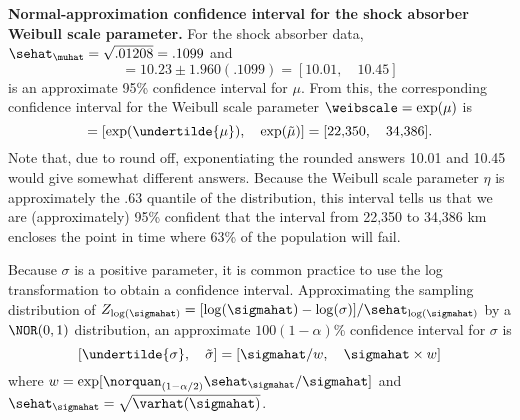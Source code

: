 \begin{example}
\label{example:normal.theory.ci.for.shock.mu}
{\bf Normal-approximation confidence interval for the shock absorber
Weibull scale parameter.} For the shock absorber data,
$\sehat_{\muhat}=\sqrt{.01208}=.1099$ and
\begin{displaymath}
 [\undertilde{\mu},\quad \tilde{\mu}] =
10.23 \pm  1.960 (.1099) = [10.01, \quad 10.45]
\end{displaymath}
is an approximate 95\% confidence interval for $\mu$.
From this, the corresponding confidence interval for
the Weibull scale parameter $\weibscale=\exp(\mu)$ is
\begin{displaymath}
 [\undertilde{\weibscale},\quad \tilde{\weibscale}] = 
	[\exp(\undertilde{\mu}),\quad \exp(\tilde{\mu})]
=[\text{22,350}, \quad \text{34,386}].
\end{displaymath}
Note that, due to round off, exponentiating the rounded answers
10.01 and 10.45 would give somewhat different answers.  Because the
Weibull scale parameter $\eta$ is approximately the .63 quantile of
the distribution, this interval tells us that we are (approximately)
95\% confident that the interval from 22,350 to 34,386 km encloses
the point in time where 63\% of the population will fail.
\end{example}

Because $\sigma$ is a positive parameter, it is common practice to
use the log transformation to obtain a confidence interval.
Approximating the sampling distribution of
$Z_{\log(\sigmahat)}=[\log(\sigmahat)-\log(\sigma)]/\sehat_{\log(\sigmahat)}$
by a $\NOR(0,1)$ distribution, an approximate $100(1-\alpha)$\%
confidence interval for $\sigma$ is
\begin{equation}
\label{equation:normal.theory.ci.for.sigma}
[ \undertilde{\sigma}, \quad \tilde{\sigma}]=
[\sigmahat/w, 
\quad
\sigmahat \times w]
\end{equation}
where $w=\exp[\norquan_{(1-\alpha/2)} \sehat_{\sigmahat}/\sigmahat]$ and 
$\sehat_{\sigmahat}=\sqrt{\varhat(\sigmahat)}$.


